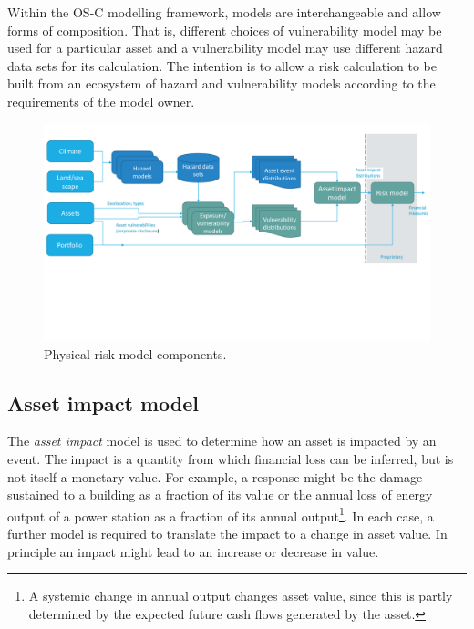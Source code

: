 \documentclass[a4paper,11pt]{extarticle} %
\begin{document}
Within the OS-C modelling framework, models are interchangeable and allow forms of composition. That is, different choices of vulnerability model may be used for a particular asset and a vulnerability model may use different hazard data sets for its calculation. The intention is to allow a risk calculation to be built from an ecosystem of hazard and vulnerability models according to the requirements of the model owner. 

\begin{figure}[ht]
	
	\begin{framed}
		\includegraphics[clip, trim=0cm 7cm 0cm 1cm, width=1.00\textwidth]{plots/top_level_view.pdf}
		
	\end{framed}
	
	\footnotesize
	
	\renewcommand{\arraystretch}{1.01}
	
	\vspace{-3ex}
		
	\vspace{-0.5ex}
	
	\caption{\small Physical risk model components. }
	\label{Fig:top_level_view}
	
\end{figure}

\subsection{Asset impact model}
The {\it asset impact} model is used to determine how an asset is impacted by an event. The impact is a quantity from which financial loss can be inferred, but is not itself a monetary value. For example, a response might be the damage sustained to a building as a fraction of its value or the annual loss of energy output of a power station as a fraction of its annual output\footnote{A systemic change in annual output changes asset value, since this is partly determined by the expected future cash flows generated by the asset.}. In each case, a further model is required to translate the impact to a change in asset value. In principle an impact might lead to an increase or decrease in value.
\end{document}
